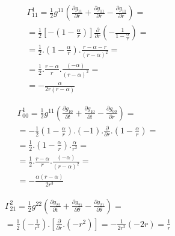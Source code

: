 \documentclass[a4paper,12pt]{article}
\begin{document}
    \begin{equation}
        \begin{aligned}
        \varGamma^1_{11} = \frac{1}{2}g^{11}\left(\frac{\partial g_{11}}{\partial r} + \frac{\partial g_{11}}{\partial r} - \frac{\partial g_{11}}{\partial r}\right) =\\
        = \frac{1}{2}\left[ - \left( 1- \frac{\alpha}{r}\right)\right] \frac{\partial}{\partial r}\left(- \frac{1}{1-\frac{\alpha}{r}}\right) =\\
        = \frac{1}{2}.\left( 1- \frac{\alpha}{r}\right).\frac{r -\alpha - r}{(r-\alpha)^2} =\\ 
        = \frac{1}{2}.\frac{r-\alpha}{r}.\frac{(-\alpha)}{(r-\alpha)^2} = \\
        = -\frac{\alpha}{2r(r-\alpha)}
        \end{aligned}
    \end{equation}
    \newline

    \begin{equation}
        \begin{aligned}
        \varGamma^1_{00} = \frac{1}{2}g^{11}\left(\frac{\partial g_{10}}{\partial t} + \frac{\partial g_{10}}{\partial t} - \frac{\partial g_{00}}{\partial r}\right) =\\
        = -\frac{1}{2}\left( 1- \frac{\alpha}{r}\right).(-1).\frac{\partial}{\partial r}.\left( 1- \frac{\alpha}{r}\right) =\\
        = \frac{1}{2}.\left( 1- \frac{\alpha}{r}\right).\frac{\alpha}{r^2} =\\ 
        = \frac{1}{2}.\frac{r-\alpha}{r}.\frac{(-\alpha)}{(r-\alpha)^2} = \\
        = -\frac{\alpha(r-\alpha)}{2r^3}
        \end{aligned}
    \end{equation}
    \newline

    \begin{equation}
        \begin{aligned}
        \varGamma^2_{21} = \frac{1}{2}g^{22}\left(\frac{\partial g_{22}}{\partial t} + \frac{\partial g_{21}}{\partial \theta} - \frac{\partial g_{21}}{\partial \theta}\right) =\\
        = \frac{1}{2}\left(- \frac{1}{r^2}\right).\left[\frac{\partial}{\partial r}.(-r^2)\right] = - \frac{1}{2r^2}(-2r) = \frac{1}{r}
        \end{aligned}
    \end{equation}
    \newline
\end{document}
